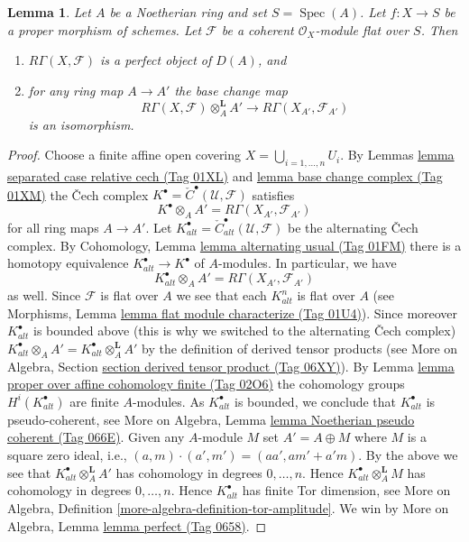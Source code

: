 \documentclass{amsart}
\theoremstyle{plain}
\newtheorem{lemma}[subsection]{Lemma}
\theoremstyle{definition}
\theoremstyle{remark}
\numberwithin{equation}{subsection}
\def\Spec{\mathop{\mathrm{Spec}}}
\begin{document}
\begin{lemma}
\label{lemma-perfect-direct-image}
Let $A$ be a Noetherian ring and set $S = \Spec(A)$. Let $f : X \to S$ be a
proper morphism of schemes. Let $\mathcal{F}$ be a coherent
$\mathcal{O}_X$-module flat over $S$. Then
\begin{enumerate}
\item $R\Gamma(X, \mathcal{F})$ is a perfect object of $D(A)$, and
\item for any ring map $A \to A'$ the base change map
$$
R\Gamma(X, \mathcal{F}) \otimes_A^{\mathbf{L}} A'
\longrightarrow
R\Gamma(X_{A'}, \mathcal{F}_{A'})
$$
is an isomorphism.
\end{enumerate}
\end{lemma}

\begin{proof}
Choose a finite affine open covering $X = \bigcup_{i = 1, \ldots, n} U_i$.
By Lemmas \href{https://stacks.math.columbia.edu/tag/01XL}{lemma separated case relative cech (Tag 01XL)} and
\href{https://stacks.math.columbia.edu/tag/01XM}{lemma base change complex (Tag 01XM)} the {\v C}ech complex
$K^\bullet = {\check C}^\bullet(\mathcal{U}, \mathcal{F})$ satisfies
$$
K^\bullet \otimes_A A' = R\Gamma(X_{A'}, \mathcal{F}_{A'})
$$
for all ring maps $A \to A'$. Let
$K_{alt}^\bullet = {\check C}_{alt}^\bullet(\mathcal{U}, \mathcal{F})$
be the alternating {\v C}ech complex. By
Cohomology, Lemma \href{https://stacks.math.columbia.edu/tag/01FM}{lemma alternating usual (Tag 01FM)}
there is a homotopy equivalence $K_{alt}^\bullet \to K^\bullet$
of $A$-modules. In particular, we have
$$
K_{alt}^\bullet \otimes_A A' = R\Gamma(X_{A'}, \mathcal{F}_{A'})
$$
as well. Since $\mathcal{F}$ is flat over $A$ we see that each $K_{alt}^n$
is flat over $A$ (see
Morphisms, Lemma \href{https://stacks.math.columbia.edu/tag/01U4}{lemma flat module characterize (Tag 01U4)}).
Since moreover $K_{alt}^\bullet$ is bounded above (this is why we switched
to the alternating {\v C}ech complex)
$K_{alt}^\bullet \otimes_A A' = K_{alt}^\bullet \otimes_A^{\mathbf{L}} A'$
by the definition of derived tensor products (see
More on Algebra, Section \href{https://stacks.math.columbia.edu/tag/06XY}{section derived tensor product (Tag 06XY)}).
By
Lemma \href{https://stacks.math.columbia.edu/tag/02O6}{lemma proper over affine cohomology finite (Tag 02O6)}
the cohomology groups $H^i(K_{alt}^\bullet)$ are finite $A$-modules.
As $K_{alt}^\bullet$ is bounded, we conclude that $K_{alt}^\bullet$
is pseudo-coherent, see
More on Algebra, Lemma \href{https://stacks.math.columbia.edu/tag/066E}{lemma Noetherian pseudo coherent (Tag 066E)}.
Given any $A$-module $M$ set $A' = A \oplus M$ where $M$ is a square zero
ideal, i.e., $(a, m) \cdot (a', m') = (aa', am' + a'm)$. By the
above we see that $K_{alt}^\bullet \otimes_A^\mathbf{L} A'$ has cohomology
in degrees $0, \ldots, n$. Hence $K_{alt}^\bullet \otimes_A^\mathbf{L} M$
has cohomology in degrees $0, \ldots, n$. Hence $K_{alt}^\bullet$ has
finite Tor dimension, see
More on Algebra, Definition \ref{more-algebra-definition-tor-amplitude}.
We win by More on Algebra, Lemma \href{https://stacks.math.columbia.edu/tag/0658}{lemma perfect (Tag 0658)}.
\end{proof}
\end{document}
